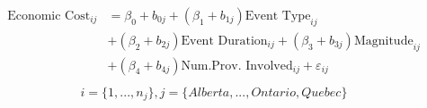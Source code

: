 \begin{align}
\begin{split}
\text{Economic Cost}_{ij}&=\beta_0+b_{0j}+(\beta_{1}+b_{1j})\text{Event Type}_{ij}\\ &+(\beta_{2}+b_{2j})\text{Event Duration}_{ij}+(\beta_{3}+b_{3j})\text{Magnitude}_{ij}\\ &+(\beta_{4}+b_{4j})\text{Num.Prov. Involved}_{ij}+\varepsilon_{ij}\\
\end{split}
\label{econ_province}
\end{align}
\begin{equation*}
i=\{1,...,n_j\},
j=\{Alberta,...,Ontario, Quebec\}
\end{equation*}
